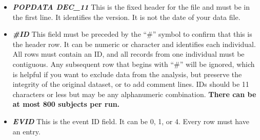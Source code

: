 \documentclass[
]{book}
\begin{document}
\begin{itemize}
\item
  \textbf{\emph{POPDATA DEC\_11}} This is the fixed header for the file and must be
  in the first line. It identifies the version. It is not the date of your
  data file.
\item
  \textbf{\emph{\#ID}} This field must be preceded by the ``\#'' symbol to confirm
  that this is the header row. It can be numeric or character and
  identifies each individual. All rows must contain an ID, and all
  records from one individual must be contiguous. Any subsequent row
  that begins with ``\#'' will be ignored, which is helpful if you want to
  exclude data from the analysis, but preserve the integrity of the
  original dataset, or to add comment lines. IDs should be 11 characters
  or less but may be any alphanumeric combination. \textbf{There can be at
  most 800 subjects per run.}
\item
  \textbf{\emph{EVID}} This is the event ID field. It can be 0, 1, or 4. Every row
  must have an entry.


\end{itemize}
\end{document}
